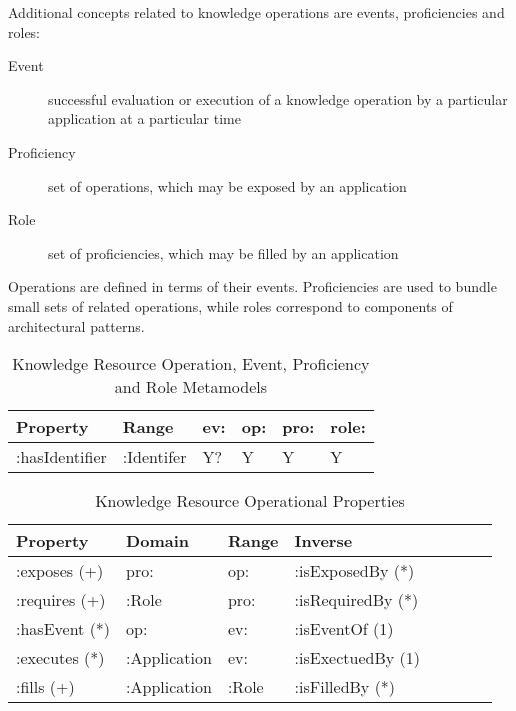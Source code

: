 \documentclass[runningheads]{llncs}
\begin{document}
Additional concepts related to knowledge operations are events, proficiencies and roles:
\begin{description}
  \item[Event] successful evaluation or execution of a knowledge operation by a particular application at a particular time
  \item[Proficiency] set of operations, which may be exposed by an application
  \item[Role] set of proficiencies, which may be filled by an application
\end{description}

Operations are defined in terms of their events. Proficiencies are used to bundle small sets of related operations, while roles correspond to components of architectural patterns.


\begin{table}[h]
\centering
\begin{tabular}{|l|l|l|l|l|l|}
 \hline
\textbf{Property} & \textbf{Range} & \textbf{ev:} & \textbf{op:}  & \textbf{pro:} & \textbf{role:} \\ \hline
:hasIdentifier    & :Identifer     & Y?           & Y             & Y             & Y              \\ \hline
\end{tabular}
\caption{Knowledge Resource Operation, Event, Proficiency and Role Metamodels}
\label{kroponto}
\end{table}

\begin{table}[h]
\begin{tabular}{|l|l|l|l|l|l|l|l|}
\hline
\textbf{Property}  &\textbf{Domain}  & \textbf{Range}  & \textbf{Inverse}
\\ \hline
:exposes (+)       & pro:            & op:             & :isExposedBy (*)         \\ \hline
:requires (+)      & :Role           & pro:            & :isRequiredBy (*)         \\ \hline
:hasEvent (*)      & op:             & ev:             & :isEventOf  (1)         \\ \hline
:executes (*)      & :Application    & ev:             & :isExectuedBy  (1)         \\ \hline
:fills (+)         & :Application    & :Role           & :isFilledBy  (*)         \\ \hline
\end{tabular}
\caption{Knowledge Resource Operational Properties}
\label{kropprop}
\end{table}
\end{document}
